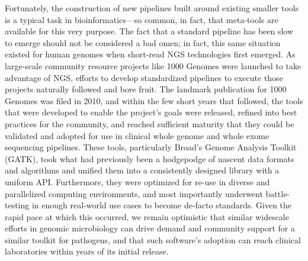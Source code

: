 Fortunately, the construction of new pipelines built around existing smaller tools is a typical task in bioinformatics—so common, in fact, that meta-tools are available for this very purpose.\autocite{Koster2012,Goecks2010,Jamil2013} The fact that a standard pipeline has been slow to emerge should not be considered a bad omen; in fact, this same situation existed for human genomes when short-read NGS technologies first emerged. As large-scale community resource projects like 1000 Genomes were launched to take advantage of NGS, efforts to develop standardized pipelines to execute those projects naturally followed and bore fruit. The landmark publication for 1000 Genomes was filed in 2010,\autocite{Durbin2010} and within the few short years that followed, the tools that were developed to enable the project's goals were released,\autocite{McKenna2010} refined into best practices for the community,\autocite{VanderAuwera2013} and reached sufficient maturity that they could be validated and adopted for use in clinical whole genome and whole exome sequencing pipelines.\autocite{Linderman2014} These tools, particularly Broad's Genome Analysis Toolkit (GATK), took what had previously been a hodgepodge of nascent data formats and algorithms and unified them into a consistently designed library with a uniform API. Furthermore, they were optimized for re-use in diverse and parallelized computing environments, and most importantly underwent battle-testing in enough real-world use cases to become de-facto standards. Given the rapid pace at which this occurred, we remain optimistic that similar widescale efforts in genomic microbiology can drive demand and community support for a similar toolkit for pathogens, and that such software's adoption can reach clinical laboratories within years of its initial release.\autocite{Pak2015}

